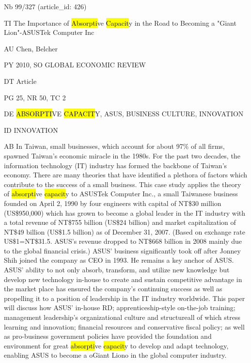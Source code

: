 \documentclass[a4paper]{article}
\begin{document}
\vspace*{-2cm}
Nb \tabto{0cm}99/327 (article\_id: 426)\par
TI \tabto{0cm}The Importance of \hl{Absorpti}ve \hl{Capacit}y in the Road to Becoming a "Giant Lion"-ASUSTek Computer Inc\par
AU \tabto{0cm}Chen, Belcher\par
PY \tabto{0cm}2010, SO GLOBAL ECONOMIC REVIEW\par
DT \tabto{0cm}Article\par
PG \tabto{0cm}25, NR 50, TC 2\par
DE \tabto{0cm}\hl{ABSORPTI}VE \hl{CAPACIT}Y, ASUS, BUSINESS CULTURE, INNOVATION\par
ID \tabto{0cm}INNOVATION\par
AB \tabto{0cm}In Taiwan, small businesses, which account for about 97\% of all firms, spawned Taiwan's economic miracle in the 1980s. For the past two decades, the information technology (IT) industry has formed the backbone of Taiwan's economy. There are many theories that have identified a plethora of factors which contribute to the success of a small business. This case study applies the theory of \hl{absorpti}ve \hl{capacit}y to ASUSTek Computer Inc., a small Taiwanese business founded on April 2, 1990 by four engineers with capital of NT\$30 million (US\$950,000) which has grown to become a global leader in the IT industry with a total revenue of NT\$755 billion (US\$24 billion) and market capitalization of NT\$49 billion (US\$1.5 billion) as of December 31, 2007. (Based on exchange rate US\$1=NT\$31.5. ASUS's revenue dropped to NT\$668 billion in 2008 mainly due to the global financial crisis.) ASUS' business significantly took off after Jonney Shih joined the company as CEO in 1993. He remains a key anchor of ASUS. ASUS' ability to not only absorb, transform, and utilize new knowledge but develop new technology in-house to create and sustain competitive advantage in the market place has ensured the company's continuing success as well as propelling it to a position of leadership in the IT industry worldwide. This paper will discuss how ASUS' in-house RD; apprenticeship-style on-the-job training; management leadership's organizational culture and structureall of which stress learning and innovation; financial resources and conservative fiscal policy; as well as pro-business government policies have provided the foundation and environment for great \hl{absorpti}ve \hl{capacit}y to develop and adapt technology, enabling ASUS to become a oGiant Liono in the global computer industry.\par
\clearpage
\end{document}
